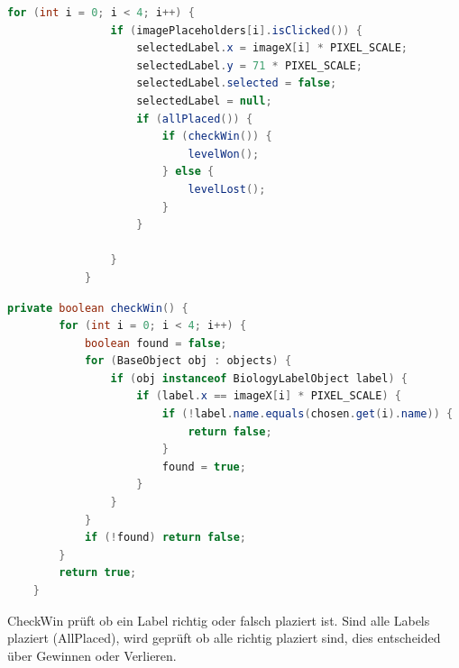 \begin{lstlisting}[language=Java, caption={Zuordnen der Labels zu den Bildern und Prüfen nach Korrektheit}]
for (int i = 0; i < 4; i++) {
                if (imagePlaceholders[i].isClicked()) {
                    selectedLabel.x = imageX[i] * PIXEL_SCALE;
                    selectedLabel.y = 71 * PIXEL_SCALE;
                    selectedLabel.selected = false;
                    selectedLabel = null;
                    if (allPlaced()) {
                        if (checkWin()) {
                            levelWon();
                        } else {
                            levelLost();
                        }
                    }

                }
            }
\end{lstlisting}

\begin{lstlisting}[language=Java, caption={CheckWin}]
private boolean checkWin() {
        for (int i = 0; i < 4; i++) {
            boolean found = false;
            for (BaseObject obj : objects) {
                if (obj instanceof BiologyLabelObject label) {
                    if (label.x == imageX[i] * PIXEL_SCALE) {
                        if (!label.name.equals(chosen.get(i).name)) {
                            return false;
                        }
                        found = true;
                    }
                }
            }
            if (!found) return false;
        }
        return true;
    }
\end{lstlisting}
CheckWin prüft ob ein Label richtig oder falsch plaziert ist. Sind alle Labels plaziert (AllPlaced), wird geprüft ob alle richtig plaziert sind, dies entscheided über Gewinnen oder Verlieren.


